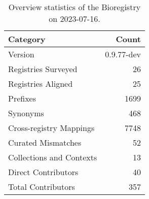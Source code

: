 \begin{table}
\caption{Overview statistics of the Bioregistry on 2023-07-16.}
\label{tab:bioregistry-summary}
\begin{tabular}{lr}
\toprule
Category & Count \\
\midrule
Version & 0.9.77-dev \\
Registries Surveyed & 26 \\
Registries Aligned & 25 \\
Prefixes & 1699 \\
Synonyms & 468 \\
Cross-registry Mappings & 7748 \\
Curated Mismatches & 52 \\
Collections and Contexts & 13 \\
Direct Contributors & 40 \\
Total Contributors & 357 \\
\bottomrule
\end{tabular}
\end{table}
